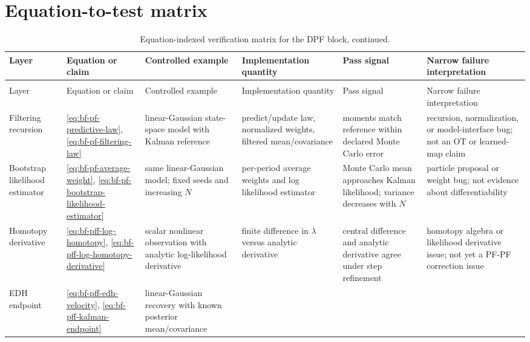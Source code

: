 \section{Equation-to-test matrix}
\label{sec:bf-dpf-debug-equation-test-matrix}

\begin{center}
\scriptsize
\begin{longtable}{@{}p{} p{} p{} p{} p{} p{}@{}}
\caption{Equation-indexed verification matrix for the DPF block.}
\label{tab:bf-dpf-debug-equation-test-matrix}\\
\toprule
Layer & Equation or claim & Controlled example & Implementation quantity & Pass signal & Narrow failure interpretation \\
\midrule
\endfirsthead
\caption[]{Equation-indexed verification matrix for the DPF block, continued.}\\
\toprule
Layer & Equation or claim & Controlled example & Implementation quantity & Pass signal & Narrow failure interpretation \\
\midrule
\endhead
\bottomrule
\endlastfoot
Filtering recursion &
\eqref{eq:bf-pf-predictive-law}, \eqref{eq:bf-pf-filtering-law} &
linear-Gaussian state-space model with Kalman reference &
predict/update law, normalized weights, filtered mean/covariance &
moments match reference within declared Monte Carlo error &
recursion, normalization, or model-interface bug; not an OT or learned-map claim \\
Bootstrap likelihood estimator &
\eqref{eq:bf-pf-average-weight}, \eqref{eq:bf-pf-bootstrap-likelihood-estimator} &
same linear-Gaussian model; fixed seeds and increasing $N$ &
per-period average weights and log likelihood estimator &
Monte Carlo mean approaches Kalman likelihood; variance decreases with $N$ &
particle proposal or weight bug; not evidence about differentiability \\
Homotopy derivative &
\eqref{eq:bf-pff-log-homotopy}, \eqref{eq:bf-pff-log-homotopy-derivative} &
scalar nonlinear observation with analytic log-likelihood derivative &
finite difference in $\lambda$ versus analytic derivative &
central difference and analytic derivative agree under step refinement &
homotopy algebra or likelihood derivative issue; not yet a PF-PF correction issue \\
EDH endpoint &
\eqref{eq:bf-pff-edh-velocity}, \eqref{eq:bf-pff-kalman-endpoint} &
linear-Gaussian recovery with known posterior mean/covariance &

\end{longtable}
\end{center}
